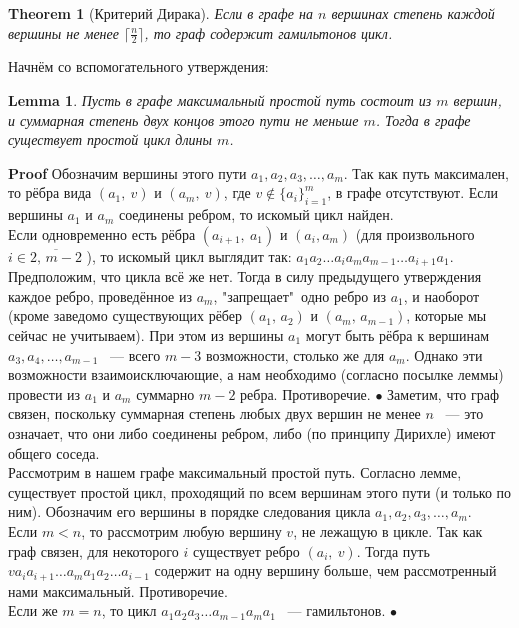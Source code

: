 \documentclass[a4paper]{article}
\theoremstyle{plain}
\newtheorem{theorem}{Theorem}
\newtheorem*{lem-star}{Lemma}
\theoremstyle{remark}
\theoremstyle{definition}
\renewenvironment{proof}{{\bfseries Proof}}{$\bullet$}
\begin{document}
\begin{theorem}[Критерий Дирака] Если в графе на $n$ вершинах степень каждой вершины не менее $\lceil \frac{n}{2} \rceil$, то граф содержит гамильтонов цикл.
\end{theorem}
\begin{proof} Начнём со вспомогательного утверждения:
\begin{lem-star} Пусть в графе максимальный простой путь состоит из $m$ вершин, и суммарная степень двух концов этого пути не меньше $m$. Тогда в графе существует простой цикл длины $m$.
\end{lem-star}
\begin{proof} Обозначим вершины этого пути $a_1,a_2,a_3,\dots,a_m$. Так как путь максимален, то рёбра вида $(a_1,\:v)$ и $(a_m,\:v)$, где $v \notin \{a_i\}_{i=1}^m$, в графе отсутствуют. 
Если вершины $a_1$ и $a_m$ соединены ребром, то искомый цикл найден.\\
Если одновременно есть рёбра $(a_{i+1},\:a_1)$ и $(a_i,a_m)$ (для произвольного $ i \in \overline{2,\, m-2} $ ), то искомый цикл выглядит так: $a_1a_2\dots a_ia_ma_{m-1}\dots a_{i+1} a_1$.
Предположим, что цикла всё же нет. Тогда в силу предыдущего утверждения каждое ребро, проведённое из $a_m$, "запрещает"\ одно ребро из $a_1$, и наоборот (кроме заведомо существующих рёбер $(a_1,\,a_2)$ и $(a_m,\,a_{m-1})$, которые мы сейчас не учитываем). При этом из вершины $a_1$ могут быть рёбра к вершинам $a_3,a_4,\dots,a_{m-1}$ ~--- всего $m-3$ возможности, столько же для $a_m$. Однако эти возможности взаимоисключающие, а нам необходимо (согласно посылке леммы) провести из $a_1$ и $a_m$ суммарно $m-2$ ребра. Противоречие.
\end{proof}
Заметим, что граф связен, поскольку суммарная степень любых двух вершин не менее $n$ ~--- это означает, что они либо соединены ребром, либо (по принципу Дирихле) имеют общего соседа.\\
Рассмотрим в нашем графе максимальный простой путь. Согласно лемме, существует простой цикл, проходящий по всем вершинам этого пути (и только по ним). Обозначим его вершины в порядке следования цикла $a_1,a_2,a_3,\dots ,a_m$.\\
Если $m<n$, то рассмотрим любую вершину $v$, не лежащую в цикле. Так как граф связен, для некоторого $i$ существует ребро $(a_i,\:v)$. Тогда путь $va_ia_{i+1}\dots a_ma_1a_2\dots a_{i-1}$ содержит на одну вершину больше, чем рассмотренный нами максимальный. Противоречие.\\
Если же $m=n$, то цикл $a_1a_2a_3\dots a_{m-1}a_ma_1$ ~--- гамильтонов.
\end{proof}
\end{document}
